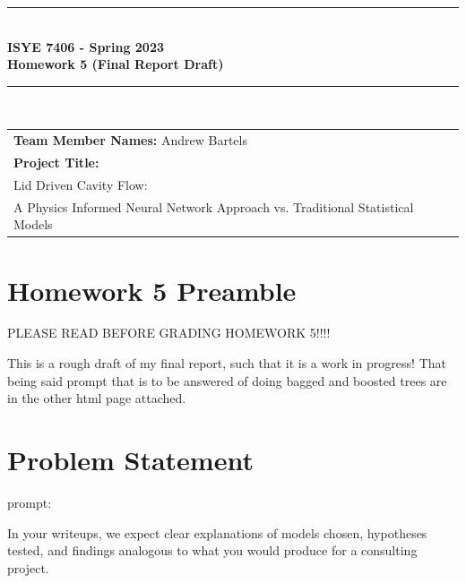 \documentclass{article}
\begin{document}
\begin{titlepage}
	\clearpage\thispagestyle{empty}
	\centering
	\vspace{1cm}

	\rule{\linewidth}{1mm} \\[0.5cm]
	{ \Large \bfseries ISYE 7406 - Spring 2023\\[0.2cm]
	Homework 5 (Final Report Draft)}\\[0.5cm]
	\rule{\linewidth}{1mm} \\[1cm]

	\begin{tabular}{l p{5cm}}
		\textbf{Team Member Names:} Andrew Bartels & \\[10pt]
		\textbf{Project Title:}                      \\ Lid Driven Cavity Flow: \\
		A Physics Informed Neural Network Approach vs.
		Traditional Statistical Models             & \\[10pt]

	\end{tabular}
\end{titlepage}

\tableofcontents
\clearpage
\thispagestyle{empty}
\listoffigures
\newpage
{}

\section{Homework 5 Preamble}

 {\LARGE PLEASE READ BEFORE GRADING HOMEWORK 5!!!!}

This is a rough draft of my final report, such that it is a work in
progress! That being said prompt that is to be answered of doing bagged and
boosted trees are in the other html page attached.

\section{Problem Statement}

prompt:

In your writeups, we expect clear explanations of models chosen,
hypotheses tested, and findings
analogous to what you would produce for a consulting project. \\
\end{document}
